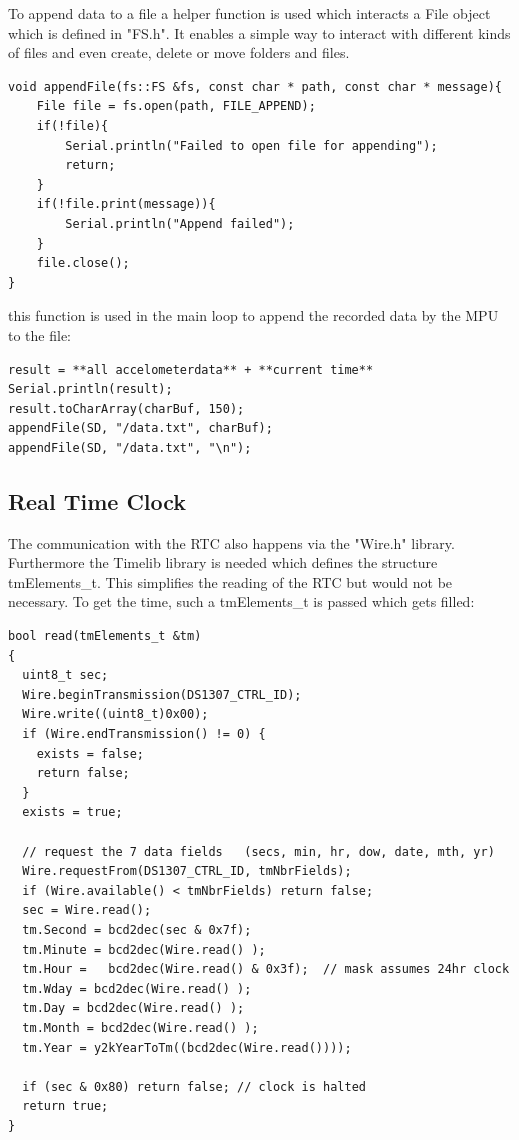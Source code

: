 To append data to a file a helper function is used which interacts a File object which is defined in "FS.h". It enables a simple way to interact with different kinds of files and even create, delete or move folders and files.

\begin{lstlisting}
void appendFile(fs::FS &fs, const char * path, const char * message){
    File file = fs.open(path, FILE_APPEND);
    if(!file){
        Serial.println("Failed to open file for appending");
        return;
    }
    if(!file.print(message)){
        Serial.println("Append failed");
    }
    file.close();
}
\end{lstlisting}
\cite{BlogofWe42:online}
this function is used in the main loop to append the recorded data by the MPU to the file: 
\begin{lstlisting}
result = **all accelometerdata** + **current time**
Serial.println(result);
result.toCharArray(charBuf, 150);
appendFile(SD, "/data.txt", charBuf);
appendFile(SD, "/data.txt", "\n");
\end{lstlisting}


\subsection{Real Time Clock}

The communication with the RTC also happens via the "Wire.h" library. Furthermore the Timelib library is needed which defines the structure tmElements\_t. This simplifies the reading of the RTC but would not be necessary. To get the time, such a tmElements\_t is passed which gets filled:
\begin{lstlisting}
bool read(tmElements_t &tm)
{
  uint8_t sec;
  Wire.beginTransmission(DS1307_CTRL_ID);
  Wire.write((uint8_t)0x00); 
  if (Wire.endTransmission() != 0) {
    exists = false;
    return false;
  }
  exists = true;

  // request the 7 data fields   (secs, min, hr, dow, date, mth, yr)
  Wire.requestFrom(DS1307_CTRL_ID, tmNbrFields);
  if (Wire.available() < tmNbrFields) return false;
  sec = Wire.read();
  tm.Second = bcd2dec(sec & 0x7f);   
  tm.Minute = bcd2dec(Wire.read() );
  tm.Hour =   bcd2dec(Wire.read() & 0x3f);  // mask assumes 24hr clock
  tm.Wday = bcd2dec(Wire.read() );
  tm.Day = bcd2dec(Wire.read() );
  tm.Month = bcd2dec(Wire.read() );
  tm.Year = y2kYearToTm((bcd2dec(Wire.read())));

  if (sec & 0x80) return false; // clock is halted
  return true;
}
\end{lstlisting}
\cite{DS1307RT51:online}

